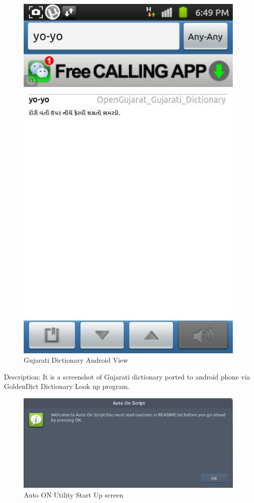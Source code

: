 \newpage
\begin{figure}[h]
\begin{center}
  \includegraphics[scale=0.67] {16.png}
  \caption[Screenshot - Gujarati Dictionary Android View]{Gujarati Dictionary Android View}
\end{center}
\end{figure}
Description: It is a screenshot of Gujarati dictionary ported to android phone via GoldenDict Dictionary Look up program.
\newpage
\begin{figure}[h]
\begin{center}
  \includegraphics[scale=0.65] {17.png}
  \caption[Screenshot - Auto ON Utility Start Up screen]{Auto ON Utility Start Up screen}
\end{center}
\end{figure}
